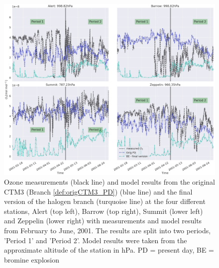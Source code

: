 \begin{figure}[h]
    \centering
    \includegraphics[width = \linewidth]{Chapter6_Results/images/ozone_stationComp_2001/ozone_2001_2periods_step5.png}
    \caption{Ozone measurements (black line) and model results from the original CTM3 (Branch \ref{def:origCTM3_PD}) (blue line) and the final version of the halogen branch (turquoise line) at the four different stations, Alert (top left), Barrow (top right), Summit (lower left) and Zeppelin (lower right) with measurements and model results from February to June, 2001. The results are split into two periods, 'Period 1' and 'Period 2'. Model results were taken from the approximate altitude of the station in hPa. PD = present day, BE = bromine explosion}
    \label{fig:2p_step5}
\end{figure}